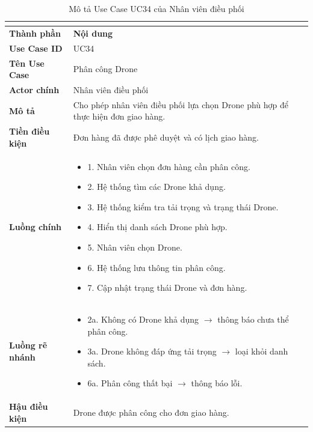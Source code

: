 \begin{longtable}{|C{3cm}|L{11cm}|}
\caption{Mô tả Use Case UC34 của Nhân viên điều phối}\\
\label{tab:mo-ta-uc34-dieu-phoi}\\
\hline
\textbf{Thành phần} & \textbf{Nội dung} \\
\hline
\textbf{Use Case ID} & UC34 \\
\hline
\textbf{Tên Use Case} & Phân công Drone \\
\hline
\textbf{Actor chính} & Nhân viên điều phối \\
\hline
\textbf{Mô tả} &
Cho phép nhân viên điều phối lựa chọn Drone phù hợp để thực hiện đơn giao hàng. \\
\hline
\textbf{Tiền điều kiện} &
Đơn hàng đã được phê duyệt và có lịch giao hàng. \\
\hline
\textbf{Luồng chính} &
\begin{itemize}[leftmargin=*,topsep=2pt,itemsep=2pt]
    \item 1. Nhân viên chọn đơn hàng cần phân công.
    \item 2. Hệ thống tìm các Drone khả dụng.
    \item 3. Hệ thống kiểm tra tải trọng và trạng thái Drone.
    \item 4. Hiển thị danh sách Drone phù hợp.
    \item 5. Nhân viên chọn Drone.
    \item 6. Hệ thống lưu thông tin phân công.
    \item 7. Cập nhật trạng thái Drone và đơn hàng.
\end{itemize} \\
\hline
\textbf{Luồng rẽ nhánh} &
\begin{itemize}[leftmargin=*,topsep=2pt,itemsep=2pt]
    \item 2a. Không có Drone khả dụng $\rightarrow$ thông báo chưa thể phân công.
    \item 3a. Drone không đáp ứng tải trọng $\rightarrow$ loại khỏi danh sách.
    \item 6a. Phân công thất bại $\rightarrow$ thông báo lỗi.
\end{itemize} \\
\hline
\textbf{Hậu điều kiện} &
Drone được phân công cho đơn giao hàng. \\
\hline
\end{longtable}


